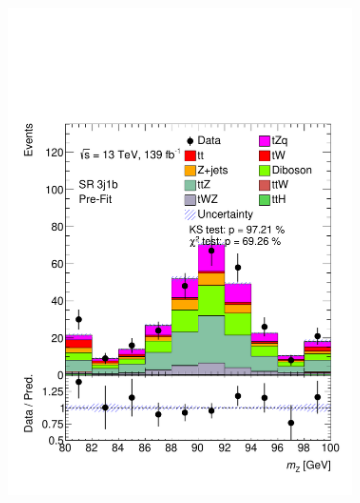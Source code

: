 \begin{figure}[!h]
\begin{subfigure}[b]{0.33\linewidth}
    \includegraphics[width=\linewidth]{ubonn-thesis/Chapters/Chapters_06/Figure/Input_distribution/SR_3j1b_MZ.pdf} 
  \end{subfigure}
  \begin{subfigure}[b]{0.33\linewidth}
    \centering

\end{subfigure}
\end{figure}
